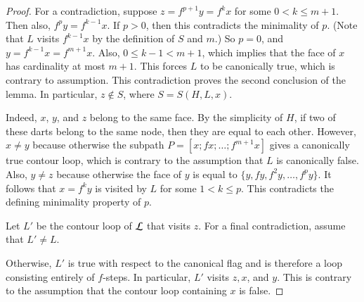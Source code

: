 \begin{proof} 
  For a contradiction, suppose $z=f^{p+1} y = f^k x$ for some $0<k\le
  m+1$.  Then also, $f^p y = f^{k-1} x$.  If $p>0$, then this
  contradicts the minimality of $p$.  (Note that $L$ visits $f^{k-1}x$
  by the definition of $S$ and $m$.)  So $p=0$, and $y=f^{k-1} x =
  f^{m+1} x$.  Also, $0\le k-1 < {m+1}$, which implies that the face
  of $x$ has cardinality at most $m+1$.  This forces $L$ to be canonically
  true, which is contrary to assumption.  This contradiction proves the second
  conclusion of the lemma.  In particular, $z\not\in S$, where $S =
  S(H,L,x)$.

    Indeed, $x$, $y$, and $z$
  belong to the same face.  By the simplicity of $H$, if two of these
  darts belong to the same node, then they are equal to each other.
  However, $x\ne y$ because otherwise the subpath $P=[x;f
  x;\ldots;f^{m+1}x]$ gives a canonically true contour loop, which is
  contrary to the assumption that $L$ is canonically false.  Also,
  $y\ne z$ because otherwise the face of $y$ is equal to $\{y,f y,f^2
  y,\ldots,f^p y\}$.  It follows that $x = f^k y$ is visited by $L$
  for some $1<k\le p$.  This contradicts the defining minimality
  property of $p$.

  Let $L'$ be the contour loop of ${\cal L}$ that visits $z$.  For a final
  contradiction, assume that $L'\ne L$.

    Otherwise, $L'$ is true with respect to the
  canonical flag and is therefore a loop consisting entirely of
  $f$-steps.  In particular, $L'$ visits $z,x$, and $y$.  This is
  contrary to the assumption that the contour loop containing $x$ is
  false.


\end{proof}
